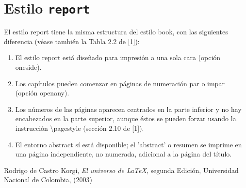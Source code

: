 \documentclass[12pt]{book}
\begin{document}
\section{\bf Estilo \tt report}
\begin{multicols}{3}
    El estilo report tiene la misma estructura del estilo book, con las siguientes diferencia (véase también la Tabla 2.2 de [1]):
\begin{enumerate}
\item[\HandCuffRight]  El estilo report está diseñado para impresión a una
sola cara (opción oneside). 
\item[\HandCuffRight]Los capítulos pueden comenzar en páginas de numeración par o impar
(opción openany).
\item[\HandCuffRight] Los números de
las páginas aparecen centrados en
la parte inferior y no hay encabezados en la parte superior, aunque éstos se pueden forzar usando la instrucción
\textbackslash pagestyle (sección 2.10 de [1]).
\item[\HandCuffRight] El entorno abstract sí está
disponible; el ’abstract’ o resumen se imprime en una página independiente, no numerada, adicional a la página del título.
\end{enumerate}

\end{multicols}
\begin{thebibliography}{}
     Rodrigo de Castro Korgi, \textit{El universo de \LaTeX}, segunda Edición, Universidad  Nacional de Colombia, (2003)
\end{thebibliography}
    
\end{document}
